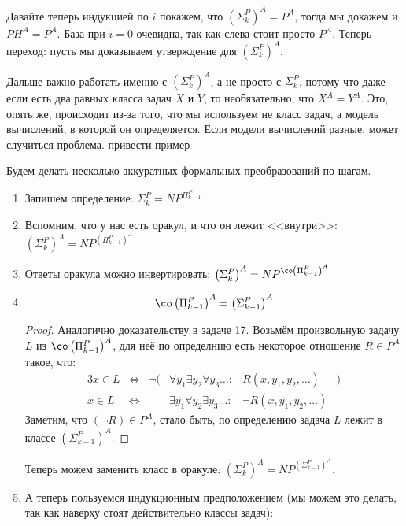 	Давайте теперь индукцией по $i$ покажем, что $\left(\Sigma_k^P\right)^A = P^A$, тогда мы докажем и $PH^A=P^A$.
	База при $i=0$ очевидна, так как слева стоит просто $P^A$.
	Теперь переход: пусть мы доказываем утверждение для $\left(\Sigma_k^P\right)^A$.
	\begin{Rem}
		Дальше важно работать именно с $\left(\Sigma_k^P\right)^A$, а не просто с $\Sigma_k^P$, потому что
		даже если есть два равных класса задач $X$ и $Y$, то необязательно, что $X^A=Y^A$.
		Это, опять же, происходит из-за того, что мы используем не класс задач, а модель вычислений, в которой он определяется.
		Если модели вычислений разные, может случиться проблема.
		\TODO привести пример
	\end{Rem}
	Будем делать несколько аккуратных формальных преобразований по шагам.
	\begin{enumerate}
		\item
			Запишем определение: $\Sigma_k^P = NP^{\Pi_{k-1}^P}$
		\item
			Вспомним, что у нас есть оракул, и что он лежит <<внутри>>: $\left(\Sigma_k^P\right)^A = NP^{\left(\Pi_{k-1}^P\right)^A}$
		\item
			Ответы оракула можно инвертировать: $\left(\Sigma_k^P\right)^A = NP^{\co\left(\Pi_{k-1}^P\right)^A}$
		\item
			\begin{lemma}
				\[ \co\left(\Pi_{k-1}^P\right)^A = \left(\Sigma_{k-1}^P\right)^A \]
			\end{lemma}
			\begin{proof}
				Аналогично \hyperref[prob17_quantors]{доказательству в задаче 17}.
				Возьмём произвольную задачу $L$ из $\co\left(\Pi_{k-1}^P\right)^A$, для неё по определнию есть некоторое отношение $R \in P^A$ такое, что:
				\begin{alignat*}{3}
					x \in L &\iff& \lnot(&\forall y_1 \exists y_2 \forall y_3 \dots \colon &      R(x, y_1, y_2, \dots)&) \\
					x \in L &\iff&       &\exists y_1 \forall y_2 \exists y_3 \dots \colon &\lnot R(x, y_1, y_2, \dots)&
				\end{alignat*}
				Заметим, что $(\lnot R) \in P^A$, стало быть, по определению задача $L$ лежит в классе $\left(\Sigma_{k-1}^P\right)^A$.
			\end{proof}
			Теперь можем заменить класс в оракуле: $\left(\Sigma_k^P\right)^A = NP^{\left(\Sigma_{k-1}^P\right)^A}$.
		\item
			А теперь пользуемся индукционным предположением (мы можем это делать, так как наверху стоят действительно классы задач):

\end{enumerate}
